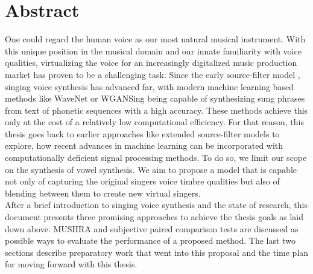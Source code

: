 \chapter*{Abstract}



One could regard the human voice as our most natural musical instrument. With this unique position in the musical domain and our innate familiarity with voice qualities, virtualizing the voice for an increasingly digitalized music production market has proven to be a challenging task. Since the early source-filter model \cite{fant_acoustic_1960}, singing voice synthesis has advanced far, with modern machine learning based methods like WaveNet \cite{oord_wavenet:_2016} or WGANSing \cite{chandna_wgansing:_2019} being capable of synthesizing sung phrases from text of phonetic sequences with a high accuracy. These methods achieve this only at the cost of a relatively low computational efficiency. For that reason, this thesis goes back to earlier approaches like extended source-filter models \cite{degottex_glottal_2010} to explore, how recent advances in machine learning can be incorporated with computationally deficient signal processing methods. To do so, we limit our scope on the synthesis of vowel synthesis. We aim to propose a model that is capable not only of capturing the original singers voice timbre qualities but also of blending between them to create new virtual singers.\\
After a brief introduction to singing voice synthesis and the state of research, this document presents three promising approaches to achieve the thesis goals as laid down above. MUSHRA \cite{itu-r_recommendation_bs.1534_method_2003} and subjective paired comparison tests are discussed as possible ways to evaluate the performance of a proposed method. The last two sections describe preparatory work that went into this proposal and the time plan for moving forward with this thesis.




